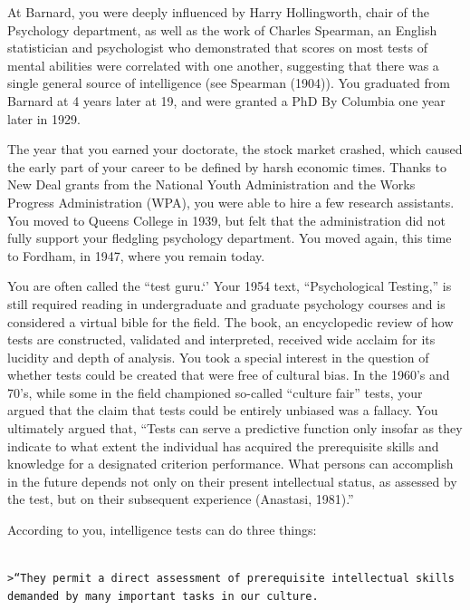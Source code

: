 At Barnard, you were deeply influenced by Harry Hollingworth, chair of the Psychology department, as well as the work of Charles Spearman, an English statistician and psychologist who demonstrated that scores on most tests of mental abilities were correlated with one another, suggesting that there was a single general source of intelligence (see Spearman (1904)). You graduated from Barnard at 4 years later at 19, and were granted a PhD By Columbia one year later in 1929.

The year that you earned your doctorate, the stock market crashed, which caused the early part of your career to be defined by harsh economic times. Thanks to New Deal grants from the National Youth Administration and the Works Progress Administration (WPA), you were able to hire a few research assistants. You moved to Queens College in 1939, but felt that the administration did not fully support your fledgling psychology department. You moved again, this time to Fordham, in 1947, where you remain today.

You are often called the “test guru.`' Your 1954 text, ``Psychological Testing,'' is still required reading in undergraduate and graduate psychology courses and is considered a virtual bible for the field. The book, an encyclopedic review of how tests are constructed, validated and interpreted, received wide acclaim for its lucidity and depth of analysis. You took a special interest in the question of whether tests could be created that were free of cultural bias. In the 1960's and 70's, while some in the field championed so-called ``culture fair'' tests, your argued that the claim that tests could be entirely unbiased was a fallacy. You ultimately argued that, “Tests can serve a predictive function only insofar as they indicate to what extent the individual has acquired the prerequisite skills and knowledge for a designated criterion performance. What persons can accomplish in the future depends not only on their present intellectual status, as assessed by the test, but on their subsequent experience (Anastasi, 1981).”

According to you, intelligence tests can do three things:

\begin{adjustwidth}{2.5em}{2.5em}
\begin{verbatim}

>“They permit a direct assessment of prerequisite intellectual skills demanded by many important tasks in our culture.

\end{verbatim}
\end{adjustwidth}

